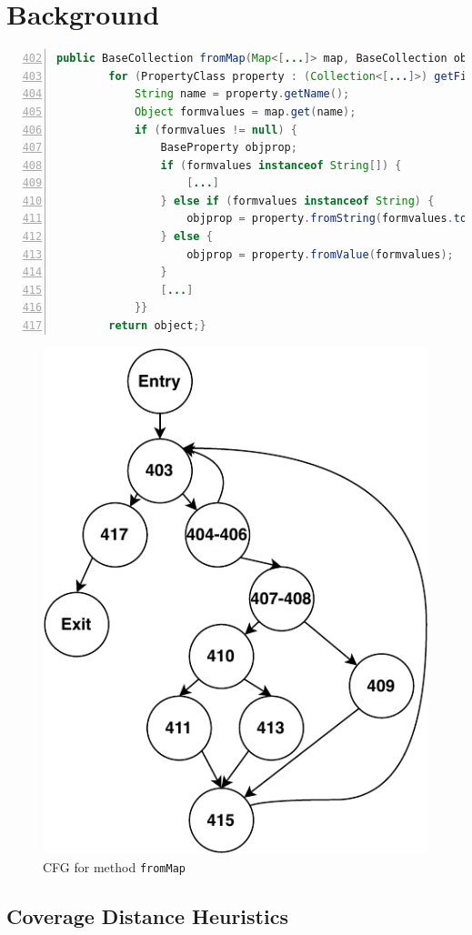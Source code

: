 \section{Background}
\label{section:bbc:background}

\begin{lstlisting}[frame=tb,
    caption={Method \texttt{fromMap} from XWIKI version 8.1 (collected in Chapter \ref{sec:jcrashpack:introduction})},
    label=list:fromMap,
    language=java,
    captionpos=t,
    numbers=left,
    basicstyle=\tiny,
    belowskip=-2.5em,
    float=t,
    firstnumber=402]
    public BaseCollection fromMap(Map<[...]> map, BaseCollection object){
        for (PropertyClass property : (Collection<[...]>) getFieldList()) {
            String name = property.getName();
            Object formvalues = map.get(name);
            if (formvalues != null) {
                BaseProperty objprop;
                if (formvalues instanceof String[]) {
                    [...]
                } else if (formvalues instanceof String) {
                    objprop = property.fromString(formvalues.toString());
                } else {
                    objprop = property.fromValue(formvalues);
                }
                [...]
            }}
        return object;}
  \end{lstlisting}
 
  \begin{figure}[t]
    \centering
    \includegraphics[width=0.35\linewidth]{papers/bbc/figures/fromMapCFG}
    
    \caption{CFG for method \texttt{fromMap}}
  \label{fig:CFG}
\end{figure}

\subsection{Coverage Distance Heuristics}
\label{section:background:distance}

